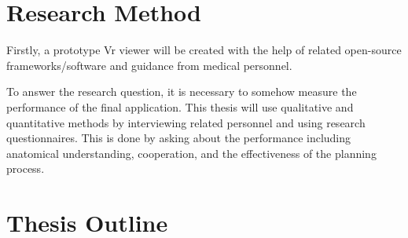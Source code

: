 \documentclass[11pt]{scrartcl}
\begin{document}
\section{Research Method}
Firstly, a prototype Vr viewer will be created with the help of related
open-source frameworks/software and guidance from medical personnel.

To answer the research question, it is necessary to somehow measure the
performance of the final application. This thesis will use qualitative and quantitative methods
by interviewing related personnel and using research questionnaires.
This is done by asking about the performance including anatomical understanding, cooperation, 
and the effectiveness of the planning process.

\section{Thesis Outline}
\end{document}
